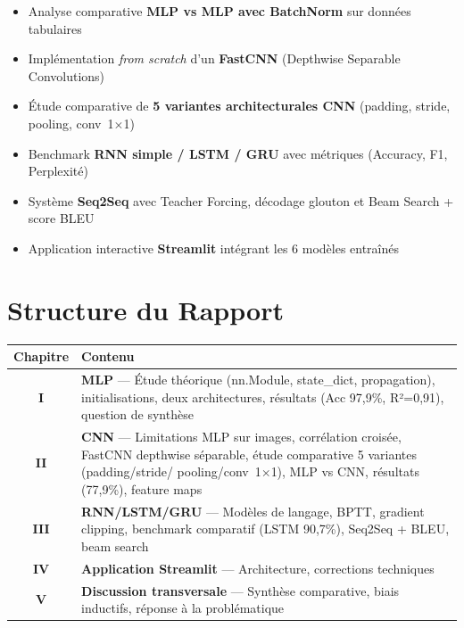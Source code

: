 \documentclass[12pt,a4paper]{report}
\begin{document}
\vspace{0.2cm}
\begin{resultbox}
\begin{itemize}[leftmargin=*,nosep]
    \item Analyse comparative \textbf{MLP vs MLP avec BatchNorm} sur données tabulaires
    \item Implémentation \textit{from scratch} d'un \textbf{FastCNN} (Depthwise Separable Convolutions)
    \item Étude comparative de \textbf{5 variantes architecturales CNN} (padding, stride, pooling, conv~1$\times$1)
    \item Benchmark \textbf{RNN simple / LSTM / GRU} avec métriques (Accuracy, F1, Perplexité)
    \item Système \textbf{Seq2Seq} avec Teacher Forcing, décodage glouton et Beam Search + score BLEU
    \item Application interactive \textbf{Streamlit} intégrant les 6 modèles entraînés
\end{itemize}
\end{resultbox}

\section*{Structure du Rapport}

\begin{center}
\begin{tcolorbox}[colback=bmwlight!20,colframe=bmwblue,arc=4pt,width=0.92\textwidth]
\renewcommand{\arraystretch}{1.3}
\begin{tabularx}{\textwidth}{@{\hspace{6pt}}cX@{\hspace{6pt}}}
\toprule
\textbf{\textcolor{bmwblue}{Chapitre}} & \textbf{\textcolor{bmwblue}{Contenu}} \\
\midrule
\textbf{I} & \textbf{MLP} --- Étude théorique (nn.Module, state\_dict, propagation),
             initialisations, deux architectures, résultats (Acc 97,9\%, R²=0,91),
             question de synthèse \\
\textbf{II} & \textbf{CNN} --- Limitations MLP sur images, corrélation croisée,
              FastCNN depthwise séparable, étude comparative 5 variantes (padding/stride/
              pooling/conv~1$\times$1), MLP vs CNN, résultats (77,9\%), feature maps \\
\textbf{III} & \textbf{RNN/LSTM/GRU} --- Modèles de langage, BPTT, gradient clipping,
               benchmark comparatif (LSTM 90,7\%), Seq2Seq + BLEU, beam search \\
\textbf{IV} & \textbf{Application Streamlit} --- Architecture, corrections techniques \\
\textbf{V} & \textbf{Discussion transversale} --- Synthèse comparative, biais inductifs,
             réponse à la problématique \\
\bottomrule
\end{tabularx}
\end{tcolorbox}
\end{center}
\end{document}

